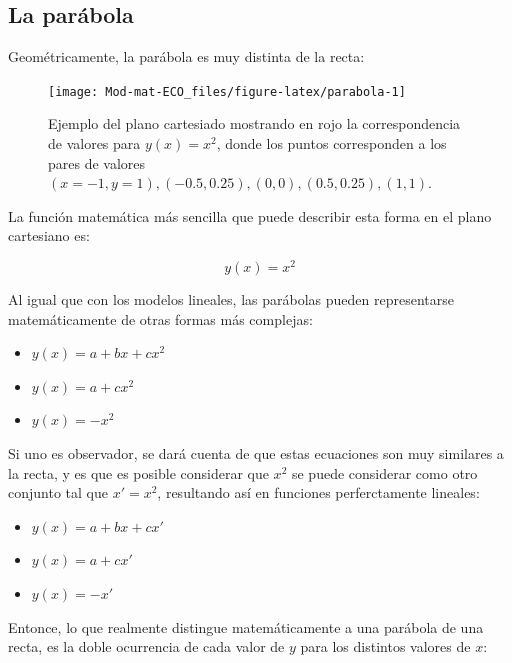 \documentclass[
]{book}
\providecommand{\tightlist}{%
  \setlength{\itemsep}{0pt}\setlength{\parskip}{0pt}}
\begin{document}
\hypertarget{la-paruxe1bola}{%
\subsection{La parábola}\label{la-paruxe1bola}}

Geométricamente, la parábola es muy distinta de la recta:

\begin{figure}

{\centering \texttt{[image: Mod-mat-ECO\_files/figure-latex/parabola-1]} 

}

\caption{Ejemplo del plano cartesiado mostrando en rojo la correspondencia de valores para $y(x) = x^2$, donde los puntos corresponden a los pares de valores $(x = -1, y = 1), (-0.5, 0.25), (0, 0), (0.5, 0.25), (1, 1)$.}\label{fig:parabola}
\end{figure}

La función matemática más sencilla que puede describir esta forma en el plano cartesiano es:

\begin{equation}
    y(x) = x^2
\end{equation}

Al igual que con los modelos lineales, las parábolas pueden representarse matemáticamente de otras formas más complejas:

\begin{itemize}
\tightlist
\item
  \(y(x) = a + bx + cx^2\)
\item
  \(y(x) = a + cx^2\)
\item
  \(y(x) = -x^2\)
\end{itemize}

Si uno es observador, se dará cuenta de que estas ecuaciones son muy similares a la recta, y es que es posible considerar que \(x^2\) se puede considerar como otro conjunto tal que \(x' = x^2\), resultando así en funciones perferctamente lineales:

\begin{itemize}
\tightlist
\item
  \(y(x) = a + bx + cx'\)
\item
  \(y(x) = a + cx'\)
\item
  \(y(x) = -x'\)
\end{itemize}

Entonce, lo que realmente distingue matemáticamente a una parábola de una recta, es la doble ocurrencia de cada valor de \(y\) para los distintos valores de \(x\):
\end{document}
